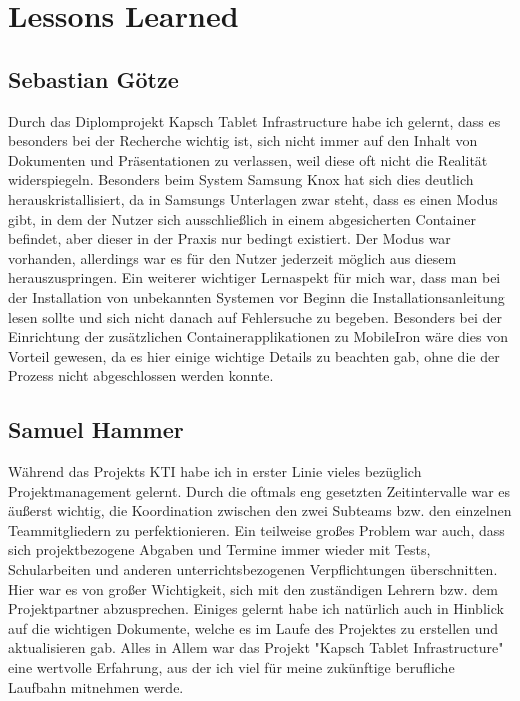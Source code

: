\chapter{Lessons Learned}
\section{Sebastian Götze}
Durch das Diplomprojekt Kapsch Tablet Infrastructure habe ich gelernt, dass es besonders bei der Recherche wichtig ist, sich nicht immer auf den Inhalt von Dokumenten und Präsentationen zu verlassen, weil diese oft nicht die Realität widerspiegeln. Besonders beim System Samsung Knox hat sich dies deutlich herauskristallisiert, da in Samsungs Unterlagen zwar steht, dass es einen Modus gibt, in dem der Nutzer sich ausschließlich in einem abgesicherten Container befindet, aber dieser in der Praxis nur bedingt existiert. Der Modus war vorhanden, allerdings war es für den Nutzer jederzeit möglich aus diesem herauszuspringen. Ein weiterer wichtiger Lernaspekt für mich war, dass man bei der Installation von unbekannten Systemen vor Beginn die Installationsanleitung lesen sollte und sich nicht danach auf Fehlersuche zu begeben. Besonders bei der Einrichtung der zusätzlichen Containerapplikationen zu MobileIron wäre dies von Vorteil gewesen, da es hier einige wichtige Details zu beachten gab, ohne die der Prozess nicht abgeschlossen werden konnte.
\section{Samuel Hammer}
Während das Projekts KTI habe ich in erster Linie vieles bezüglich Projektmanagement gelernt. Durch die oftmals eng gesetzten Zeitintervalle war es äußerst wichtig, die Koordination zwischen den zwei Subteams bzw. den einzelnen Teammitgliedern zu perfektionieren. 
Ein teilweise großes Problem war auch, dass sich projektbezogene Abgaben und Termine immer wieder mit Tests, Schularbeiten und anderen unterrichtsbezogenen Verpflichtungen überschnitten. Hier war es von großer Wichtigkeit, sich mit den zuständigen Lehrern bzw. dem Projektpartner abzusprechen. 
Einiges gelernt habe ich natürlich auch in Hinblick auf die wichtigen Dokumente, welche es im Laufe des Projektes zu erstellen und aktualisieren gab.
Alles in Allem war das Projekt "Kapsch Tablet Infrastructure" eine wertvolle Erfahrung, aus der ich viel für meine zukünftige berufliche Laufbahn mitnehmen werde.

\newpage

